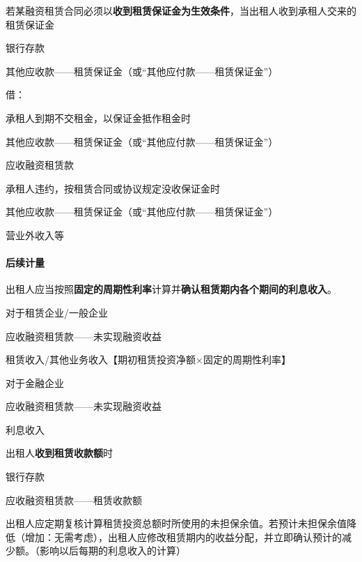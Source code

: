 \documentclass[UTF8,12pt]{ctexart}
\newenvironment{Dr}{%
	\begin{list}{}%
		{
			\setlength{\leftmargin}{2em}
			\setlength{\labelwidth}{2em}
			\setlength{\labelsep}{0pt}
			\setlength{\itemindent}{0pt}
			\setlength{\listparindent}{0pt}
			\setlength{\parsep}{0pt}
			\setlength{\topsep}{0pt}
		}
		\item[\textbf{借：}]
	}{%
	\end{list}
}
\newenvironment{Cr}{%
	\begin{list}{}%
		{
			\setlength{\leftmargin}{3em}
			\setlength{\labelwidth}{2em}
			\setlength{\labelsep}{0pt}
			\setlength{\itemindent}{0pt}
			\setlength{\listparindent}{0pt}
			\setlength{\parsep}{0pt}
			\setlength{\topsep}{0pt}
		}
		\item[\textbf{贷：}]
	}{%
	\end{list}
}
\numberwithin{equation}{section} %
\numberwithin{figure}{section}
\numberwithin{table}{section}
\begin{document}
	若某融资租赁合同必须以\textbf{收到租赁保证金为生效条件}，当出租人收到承租人交来的租赁保证金
	\begin{Dr}
		银行存款
	\end{Dr}
	\begin{Cr}
		其他应收款——租赁保证金（或“其他应付款——租赁保证金”）
	\end{Cr}借：
	
	承租人到期不交租金，以保证金抵作租金时
	\begin{Dr}
		其他应收款——租赁保证金（或“其他应付款——租赁保证金”）
	\end{Dr}
	\begin{Cr}
		应收融资租赁款
	\end{Cr}
	
	承租人违约，按租赁合同或协议规定没收保证金时
	\begin{Dr}
		其他应收款——租赁保证金（或“其他应付款——租赁保证金”）
	\end{Dr}
	\begin{Cr}
		营业外收入等
	\end{Cr}
	
	\paragraph{后续计量}
	出租人应当按照\textbf{固定的周期性利率}计算并\textbf{确认租赁期内各个期间的利息收入}。
	
	对于租赁企业/一般企业
	\begin{Dr}
		应收融资租赁款——未实现融资收益
	\end{Dr}
	\begin{Cr}
		租赁收入/其他业务收入【期初租赁投资净额×固定的周期性利率】
	\end{Cr}

	对于金融企业
	\begin{Dr}
		应收融资租赁款——未实现融资收益
	\end{Dr}
	\begin{Cr}
		利息收入
	\end{Cr}
	
	出租人\textbf{收到租赁收款额}时
	\begin{Dr}
		银行存款
	\end{Dr}
	\begin{Cr}
		应收融资租赁款——租赁收款额
	\end{Cr}
	
	出租人应定期复核计算租赁投资总额时所使用的未担保余值。若预计未担保余值降低（增加：无需考虑），出租人应修改租赁期内的收益分配，并立即确认预计的减少额。（影响以后每期的利息收入的计算）
	
\end{document}
